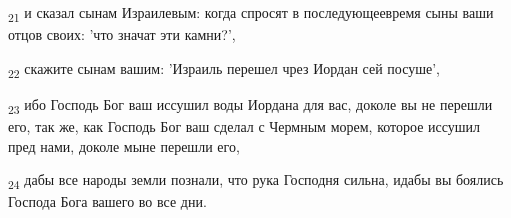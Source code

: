 \begin{tcolorbox}
\textsubscript{21} и сказал сынам Израилевым: когда спросят в последующеевремя сыны ваши отцов своих: 'что значат эти камни?',
\end{tcolorbox}
\begin{tcolorbox}
\textsubscript{22} скажите сынам вашим: 'Израиль перешел чрез Иордан сей посуше',
\end{tcolorbox}
\begin{tcolorbox}
\textsubscript{23} ибо Господь Бог ваш иссушил воды Иордана для вас, доколе вы не перешли его, так же, как Господь Бог ваш сделал с Чермным морем, которое иссушил пред нами, доколе мыне перешли его,
\end{tcolorbox}
\begin{tcolorbox}
\textsubscript{24} дабы все народы земли познали, что рука Господня сильна, идабы вы боялись Господа Бога вашего во все дни.
\end{tcolorbox}
